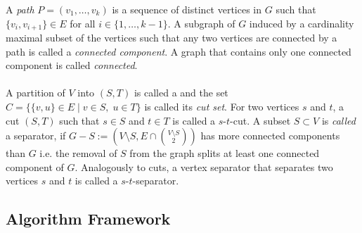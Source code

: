 \documentclass[]{article}
\begin{document}
A \textit{path} $P=(v_1,\dots,v_k)$ is a sequence of distinct vertices in $G$ such that $\{v_i,v_{i+1}\}\in E$ for all $i \in \{1,\dots,k-1\}$. A subgraph of $G$ induced by a cardinality maximal subset of the vertices such that any two vertices are connected by a path is called a \textit{connected component}. A graph that contains only one connected component is called \textit{connected}. \paragraph{}
A partition of $V$ into $(S,T)$ is called a  and the set $C = \{\{v,u\}\in E\;|\;v\in S,\; u\in T\}$ is called its \textit{cut set}. For two vertices $s$ and $t$, a cut $(S, T)$ such that $s\in S$ and $t\in T$ is called a $s$-$t$-cut. A subset $S\subset V$ is \textit{called} a separator, if $G-S := (V\setminus S, E\cap\binom{V\setminus S}{2})$ has more connected components than $G$ i.e. the removal of $S$ from the graph splits at least one connected component of $G$. Analogously to cuts, a vertex separator that separates two vertices $s$ and $t$ is called a $s$-$t$-separator.

\subsection{Algorithm Framework}
\end{document}
